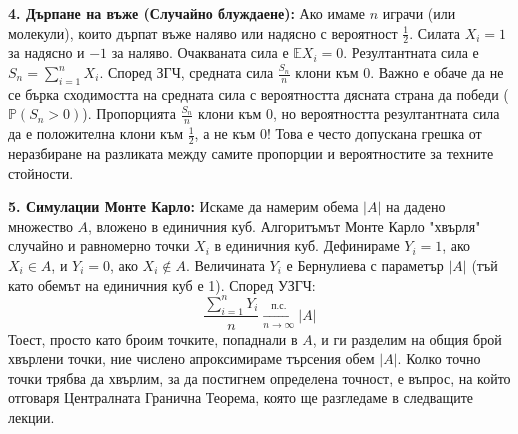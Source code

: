 \documentclass{article}
\begin{document}
\textbf{4. Дърпане на въже (Случайно блуждаене):}
Ако имаме $n$ играчи (или молекули), които дърпат въже наляво или надясно с вероятност $\frac{1}{2}$. Силата $X_i = 1$ за надясно и $-1$ за наляво. Очакваната сила е $\mathbb{E}X_i = 0$. Резултантната сила е $S_n = \sum_{i=1}^n X_i$. Според ЗГЧ, средната сила $\frac{S_n}{n}$ клони към 0. Важно е обаче да не се бърка сходимостта на средната сила с вероятността дясната страна да победи ($\mathbb{P}(S_n > 0)$). Пропорцията $\frac{S_n}{n}$ клони към 0, но вероятността резултантната сила да е положителна клони към $\frac{1}{2}$, а не към 0! Това е често допускана грешка от неразбиране на разликата между самите пропорции и вероятностите за техните стойности.

\textbf{5. Симулации Монте Карло:}
Искаме да намерим обема $|A|$ на дадено множество $A$, вложено в единичния куб. Алгоритъмът Монте Карло "хвърля" случайно и равномерно точки $X_i$ в единичния куб. Дефинираме $Y_i = 1$, ако $X_i \in A$, и $Y_i = 0$, ако $X_i \notin A$. Величината $Y_i$ е Бернулиева с параметър $|A|$ (тъй като обемът на единичния куб е 1). Според УЗГЧ:
\[
\frac{\sum_{i=1}^n Y_i}{n} \xrightarrow[n \to \infty]{\text{п.с.}} |A|
\]
Тоест, просто като броим точките, попаднали в $A$, и ги разделим на общия брой хвърлени точки, ние числено апроксимираме търсения обем $|A|$. Колко точно точки трябва да хвърлим, за да постигнем определена точност, е въпрос, на който отговаря Централната Гранична Теорема, която ще разгледаме в следващите лекции.
\end{document}
